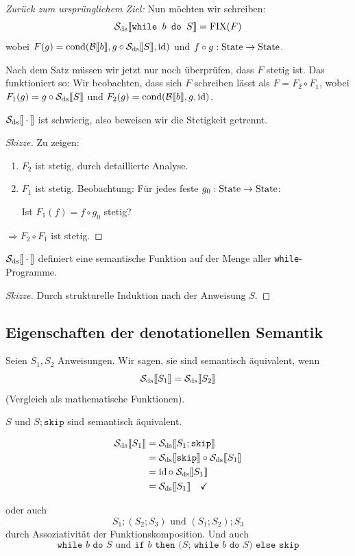 \par\medskip
\emph{Zurück zum ursprünglichem Ziel:} Nun möchten wir schreiben: \[ \Sdssem{\texttt{while $b$ do $S$}} = \fix(F)
\] wobei $F(g) = \cond(\Bsem{b}, g \circ \Sdssem{S}, \id)$ und $f \circ g: \State \to \State$.


Nach dem Satz müssen wir jetzt nur noch überprüfen, dass $F$ stetig ist.
Das funktioniert so: Wir beobachten, dass sich $F$ schreiben lässt als $F = F_2 \circ F_1$, wobei $F_1(g) = g \circ \Sdssem{S}$
und $F_2(g) = \cond(\Bsem{b}, g, \id)$.

$\Sdssem{\cdot}$ ist schwierig, also beweisen wir die Stetigkeit getrennt.

\begin{proof}[Skizze]
    Zu zeigen:
    \begin{enumerate}
        \item $F_2$ ist stetig, durch detaillierte Analyse.
        \item $F_1$ ist stetig. Beobachtung: Für jedes feste $g_0: \State \to \State$:

            Ist $F_1(f) = f \circ g_0$ stetig?
    \end{enumerate}
    $\Rightarrow F_2 \circ F_1$ ist stetig.
\end{proof}


\begin{theorem}
    $\Sdssem{\cdot}$ definiert eine semantische Funktion auf der Menge aller \texttt{while}-Programme.
\end{theorem}

\begin{proof}[Skizze]
    Durch strukturelle Induktion nach der Anweisung $S$.
\end{proof}



\subsection{Eigenschaften der denotationellen Semantik}

Seien $S_1, S_2$ Anweisungen. Wir sagen, sie sind semantisch äquivalent, wenn \[
    \Sdssem{S_1} = \Sdssem{S_2}
\] (Vergleich als mathematische Funktionen).

\par\medskip
\begin{example}
    $S$ und $S; \texttt{skip}$ sind semantisch äquivalent.

    \begin{align*}
        \Sdssem{S_1} & = \Sdssem{S_1; \texttt{skip}} \\
        & =\Sdssem{\texttt{skip}} \circ \Sdssem{S_1} \\
        & = \id \circ \; \Sdssem{S_1} \\
        & = \Sdssem{S_1} \quad \checkmark
    \end{align*}

    oder auch \[
        S_1; (S_2; S_3) \text{ und } (S_1; S_2); S_3
    \] durch Assoziativität der Funktionskomposition. Und auch \[
        \texttt{while $b$ do $S$} \text{ und } \texttt{if $b$ then ($S$; while $b$ do $S$) else skip}
    \]
\end{example}


